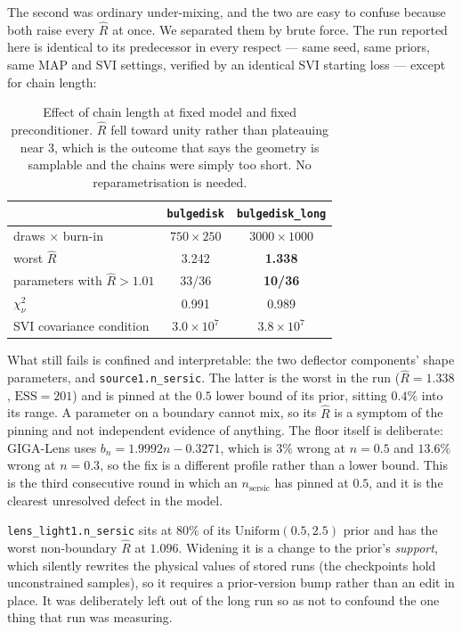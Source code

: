 \documentclass[11pt]{article}
\newcommand{\chisqv}{\ensuremath{\chi^{2}_{\nu}}}
\begin{document}
The second was ordinary under-mixing, and the two are easy to confuse because both raise
every $\hat{R}$ at once. We separated them by brute force. The run reported here is
identical to its predecessor in every respect --- same seed, same priors, same MAP and SVI
settings, verified by an identical SVI starting loss --- except for chain length:

\begin{table}[htbp]
  \centering
  \caption{Effect of chain length at fixed model and fixed preconditioner. $\hat{R}$ fell
    toward unity rather than plateauing near 3, which is the outcome that says the
    geometry is samplable and the chains were simply too short. No reparametrisation is
    needed.}
  \label{tab:conv}
  \begin{tabular}{lcc}
    \toprule
     & \texttt{bulgedisk} & \texttt{bulgedisk\_long} \\
    \midrule
    draws $\times$ burn-in        & $750 \times 250$ & $3000 \times 1000$ \\
    worst $\hat{R}$               & 3.242            & \textbf{1.338} \\
    parameters with $\hat{R}>1.01$& 33/36            & \textbf{10/36} \\
    \chisqv                       & 0.991            & 0.989 \\
    SVI covariance condition      & $3.0\times10^{7}$& $3.8\times10^{7}$ \\
    \bottomrule
  \end{tabular}
\end{table}

What still fails is confined and interpretable: the two deflector components' shape
parameters, and \texttt{source1.n\_sersic}. The latter is the worst in the run
($\hat{R} = 1.338$, $\mathrm{ESS} = 201$) and is pinned at the $0.5$ lower bound of its
prior, sitting $0.4\%$ into its range. A parameter on a boundary cannot mix, so its
$\hat{R}$ is a symptom of the pinning and not independent evidence of anything. The floor
itself is deliberate: GIGA-Lens uses $b_{n} = 1.9992n - 0.3271$, which is $3\%$ wrong at
$n = 0.5$ and $13.6\%$ wrong at $n = 0.3$, so the fix is a different profile rather than a
lower bound. This is the third consecutive round in which an $n_{\mathrm{sersic}}$ has
pinned at $0.5$, and it is the clearest unresolved defect in the model.

\texttt{lens\_light1.n\_sersic} sits at $80\%$ of its $\mathrm{Uniform}(0.5, 2.5)$ prior
and has the worst non-boundary $\hat{R}$ at $1.096$. Widening it is a change to the
prior's \emph{support}, which silently rewrites the physical values of stored runs (the
checkpoints hold unconstrained samples), so it requires a prior-version bump rather than
an edit in place. It was deliberately left out of the long run so as not to confound the
one thing that run was measuring.
\end{document}
